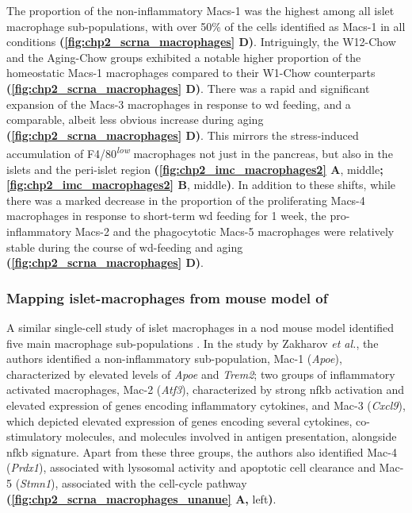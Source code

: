 \par The proportion of the non-inflammatory Macs-1 was the highest among all islet macrophage sub-populations, with over 50\% of the cells identified as Macs-1 in all conditions \textbf{(\autoref{fig:chp2_scrna_macrophages} D)}. Intriguingly, the W12-Chow and the Aging-Chow groups exhibited a notable higher proportion of the homeostatic Macs-1 macrophages compared to their W1-Chow counterparts \textbf{(\autoref{fig:chp2_scrna_macrophages} D)}. There was a rapid and significant expansion of the Macs-3 macrophages in response to \gls{wd} feeding, and a comparable, albeit less obvious increase during aging \textbf{(\autoref{fig:chp2_scrna_macrophages} D)}. This mirrors the stress-induced accumulation of F4/80\textsuperscript{\textit{low}} macrophages not just in the pancreas, but also in the islets and the peri-islet region \textbf{(\autoref{fig:chp2_imc_macrophages2} A}, middle\textbf{; \autoref{fig:chp2_imc_macrophages2} B}, middle\textbf{)}. In addition to these shifts, while there was a marked decrease in the proportion of the proliferating Macs-4 macrophages in response to short-term \gls{wd} feeding for 1 week, the pro-inflammatory Macs-2 and the phagocytotic Macs-5 macrophages were relatively stable during the course of \gls{wd}-feeding and aging \textbf{(\autoref{fig:chp2_scrna_macrophages} D)}.


\subsubsection{\large Mapping islet-macrophages from  mouse model of }


A similar single-cell study of islet macrophages in a \gls{nod} mouse model identified five main macrophage sub-populations \textbf{\cite{zakharov_single-cell_2020}}. In the study by Zakharov \textit{et al.}, the authors identified a non-inflammatory sub-population, Mac-1 (\textit{Apoe}), characterized by elevated levels of \textit{Apoe} and \textit{Trem2}; two groups of inflammatory activated macrophages, Mac-2 (\textit{Atf3}), characterized by strong \gls{nfkb} activation and elevated expression of genes encoding inflammatory cytokines, and Mac-3 (\textit{Cxcl9}), which depicted elevated expression of genes encoding several cytokines, co-stimulatory molecules, and molecules involved in antigen presentation, alongside \gls{nfkb} signature. Apart from these three groups, the authors also identified Mac-4 (\textit{Prdx1}), associated with lysosomal activity and apoptotic cell clearance and Mac-5 (\textit{Stmn1}), associated with the cell-cycle pathway \textbf{(\autoref{fig:chp2_scrna_macrophages_unanue} A,} left\textbf{)}.\\

